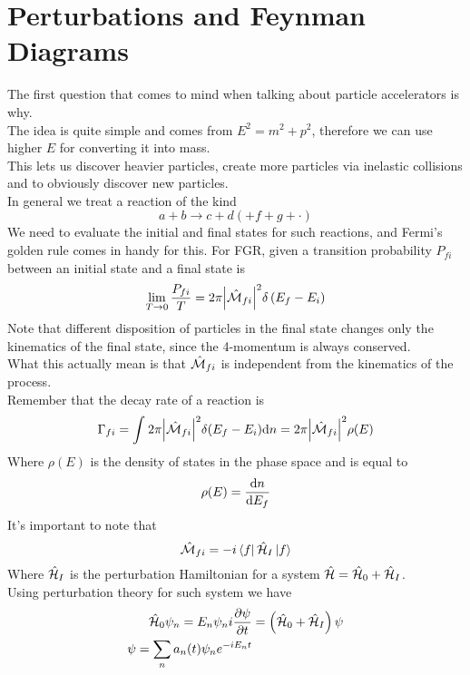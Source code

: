 \documentclass[../qm.tex]{subfiles}
\begin{document}
\section{Perturbations and Feynman Diagrams}
The first question that comes to mind when talking about particle accelerators is why.\\
The idea is quite simple and comes from $E^2=m^2+p^2$, therefore we can use higher $E$ for converting it into mass.\\
This lets us discover heavier particles, create more particles via inelastic collisions and to obviously discover new particles.\\
In general we treat a reaction of the kind
\begin{equation*}
	a+b\to c+d(+f+g+\cdot)
\end{equation*}
We need to evaluate the initial and final states for such reactions, and Fermi's golden rule comes in handy for this. For FGR, given a transition probability $P_{fi}$ between an initial state and a final state is
\begin{equation}
	\lim_{T\to0}\frac{P_{fi}}{T}=2\pi\abs{\hat{\mathcal{M}}_{fi}}^2\delta\left( E_f-E_i \right)
	\label{eq:fgr}
\end{equation}
Note that different disposition of particles in the final state changes only the kinematics of the final state, since the 4-momentum is always conserved.\\
What this actually mean is that $\hat{\mathcal{M}}_{fi}$ is independent from the kinematics of the process.\\
Remember that the decay rate of a reaction is
\begin{equation}
	\Gamma_{fi}=\int_{}^{}2\pi\abs{\hat{\mathcal{M}}_{fi}}^2\delta(E_f-E_i)\dd n=2\pi\abs{\hat{\mathcal{M}}_{fi}}^2\rho(E)
	\label{eq:transitionrateqft}
\end{equation}
Where $\rho(E)$ is the density of states in the phase space and is equal to
\begin{equation}
	\rho(E)=\dv{n}{E_f}
	\label{eq:statedensityqft}
\end{equation}
It's important to note that
\begin{equation}
	\hat{\mathcal{M}}_{fi}=-i\bra{f}\hat{\mathcal{H}}_I\ket{f}
	\label{eq:transmatrixqft}
\end{equation}
Where $\hat{\mathcal{H}}_I$ is the perturbation Hamiltonian for a system $\hat{\mathcal{H}}=\hat{\mathcal{H}}_0+\hat{\mathcal{H}}_I$.\\
Using perturbation theory for such system we have
\begin{equation}
	\begin{aligned}
		\hat{\mathcal{H}}_0\psi_n=E_n\psi_n
		i\pdv{\psi}{t}&=\left( \hat{\mathcal{H}}_0+\hat{\mathcal{H}}_I \right)\psi\\
		\psi=\sum_na_n(t)\psi_ne^{-iE_nt}
	\end{aligned}
	\label{eq:perturbtheory1st}
\end{equation}
\end{document}
